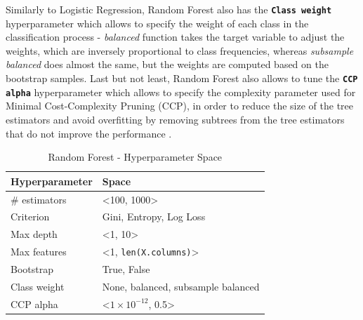 Similarly to Logistic Regression, Random Forest also has the \textbf{\texttt{Class weight}} hyperparameter which allows to specify the weight of each class in the classification process - \textit{balanced} function takes the target variable to adjust the weights, which are inversely proportional to class frequencies, whereas \textit{subsample balanced} does almost the same, but the weights are computed based on the bootstrap samples.
Last but not least, Random Forest also allows to tune the \textbf{\texttt{CCP alpha}} hyperparameter which allows to specify the complexity parameter used for Minimal Cost-Complexity Pruning (CCP), in order to reduce the size of the tree estimators and avoid overfitting by removing subtrees from the tree estimators that do not improve the performance \citep{scikit-rf}.

\begin{table}[H]
\small
\setlength{\tabcolsep}{8pt}
\renewcommand{\arraystretch}{1.3}
\centering
    \caption[Random Forest - Hyperparameter Space]{Random Forest - Hyperparameter Space}\label{tab:rfspace}
    \begin{tabular}{ll}
\toprule
\textbf{Hyperparameter} & \textbf{Space}\\
\midrule
\hline
\# estimators & <100, 1000> \\
Criterion & Gini, Entropy, Log Loss \\
Max depth & <1, 10> \\
Max features & <1, \verb|len(X.columns)|>  \\
Bootstrap & True, False \\
Class weight & None, balanced, subsample balanced \\
CCP alpha & <$1\times10^{-12}$, 0.5> \\
\hline
\bottomrule
\end{tabular}
\vspace{0.7em}

\vspace{-1em}
\end{table}

\newpage
